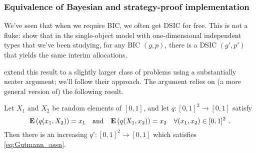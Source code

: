 \documentclass[11pt,letterpaper,reqno,oneside]{article}
\begin{document}



\subsubsection{Equivalence of Bayesian and strategy-proof implementation}
\label{sec:mech_desi:several_agents_one_dimension:equivalence_BIC_DSIC}

We've seen that when we require BIC, we often get DSIC for free. This is not a fluke: \textcite{ManelliVincent2010} show that in the single-object model with one-dimensional independent types that we've been studying, for any BIC $(g,p)$, there is a DSIC $(g',p')$ that yields the same interim allocations.

\textcite{GershkovEtAl2013} extend this result to a slightly larger class of problems using a substantially neater argument; we'll follow their approach. The argument relies on (a more general version of) the following result.
%
\begin{theorem}
	\label{theorem:Gutmann}
	Let $X_1$ and $X_2$ be random elements of $[0,1]$, and let $q : [0,1]^2 \to [0,1]$ satisfy
	\begin{equation}
		\label{eq:Gutmann_assn}
		\mathbf{E}\left( q(x_1,X_2) \right) = x_1
		\quad\text{and}\quad
		\mathbf{E}\left( q(X_1,x_2) \right) = x_2
		\quad\text{$\forall(x_1,x_2) \in [0,1]^2$ } .
	\end{equation}
	Then there is an increasing $q' : [0,1]^2 \to [0,1]$ which satisfies \eqref{eq:Gutmann_assn}.
\end{theorem}
\end{document}
